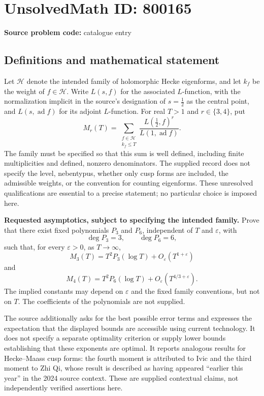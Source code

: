 \documentclass[11pt]{article}
\begin{document}
\section*{UnsolvedMath ID: 800165}
\textbf{Source problem code:} catalogue entry
\subsection{Definitions and mathematical statement}
Let \(\mathcal H\) denote the intended family of holomorphic Hecke eigenforms, and let \(k_f\) be the weight of \(f\in\mathcal H\). Write \(L(s,f)\) for the associated \(L\)-function, with the normalization implicit in the source's designation of \(s=\tfrac12\) as the central point, and \(L(s,\operatorname{ad}f)\) for its adjoint \(L\)-function. For real \(T>1\) and \(r\in\{3,4\}\), put
\[
M_r(T)=\sum_{\substack{f\in\mathcal H\\ k_f\leq T}}
\frac{L(\tfrac12,f)^r}{L(1,\operatorname{ad}f)}.
\]
The family must be specified so that this sum is well defined, including finite multiplicities and defined, nonzero denominators. The supplied record does not specify the level, nebentypus, whether only cusp forms are included, the admissible weights, or the convention for counting eigenforms. These unresolved qualifications are essential to a precise statement; no particular choice is imposed here.

\textbf{Requested asymptotics, subject to specifying the intended family.} Prove that there exist fixed polynomials \(P_3\) and \(P_6\), independent of \(T\) and \(\varepsilon\), with
\[
\deg P_3=3,\qquad \deg P_6=6,
\]
such that, for every \(\varepsilon>0\), as \(T\to\infty\),
\[
M_3(T)=T^2P_3(\log T)+O_{\varepsilon}(T^{1+\varepsilon})
\]
and
\[
M_4(T)=T^2P_6(\log T)+O_{\varepsilon}(T^{4/3+\varepsilon}).
\]
The implied constants may depend on \(\varepsilon\) and the fixed family conventions, but not on \(T\). The coefficients of the polynomials are not supplied.

The source additionally asks for the best possible error terms and expresses the expectation that the displayed bounds are accessible using current technology. It does not specify a separate optimality criterion or supply lower bounds establishing that these exponents are optimal. It reports analogous results for Hecke--Maass cusp forms: the fourth moment is attributed to Ivic and the third moment to Zhi Qi, whose result is described as having appeared ``earlier this year'' in the 2024 source context. These are supplied contextual claims, not independently verified assertions here.
\end{document}

